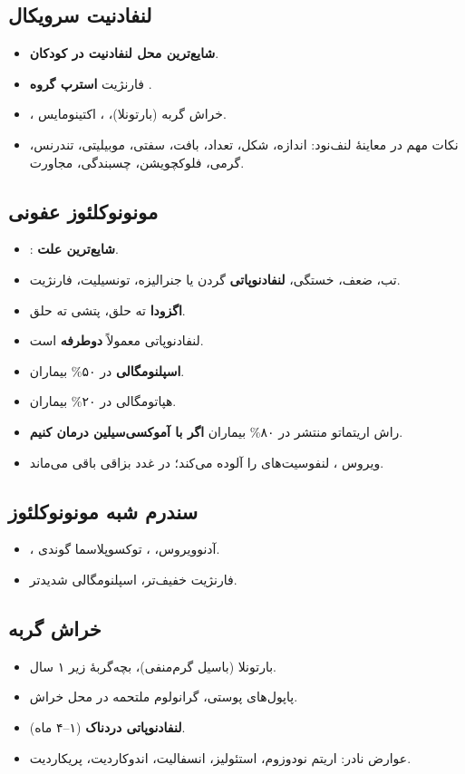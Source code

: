 \documentclass[12pt,a4paper]{article}
\begin{document}
\subsection*{لنفادنیت سرویکال}
\begin{itemize}
\item \textbf{شایع‌ترین محل لنفادنیت در کودکان}.
\item فارنژیت \LymphArrow{} \textbf{استرپ گروه }.
\item {}، خراش گربه (بارتونلا)، ، اکتینومایس.
\item نکات مهم در معاینهٔ لنف‌نود:
  اندازه، شکل، تعداد، بافت، سفتی، موبیلیتی، تندرنس، گرمی،
  فلوکچویشن، چسبندگی، مجاورت.
\end{itemize}

\clearpage
{}

\subsection*{مونونوکلئوز عفونی}
\begin{itemize}
\item {}: \textbf{شایع‌ترین علت}.
\item تب، ضعف، خستگی، \textbf{لنفادنوپاتی} گردن یا جنرالیزه،
  تونسیلیت، فارنژیت.
\item \textbf{اگزودا} ته حلق، پتشی ته حلق.
\item لنفادنوپاتی معمولاً \textbf{دوطرفه} است.
\item \textbf{اسپلنومگالی} در ۵۰\% بیماران.
\item هپاتومگالی در ۲۰\% بیماران.
\item راش اریتماتو منتشر در ۸۰\% بیماران
  \LymphArrow{} \textbf{اگر با آموکسی‌سیلین درمان کنیم}.
\item ویروس ، لنفوسیت‌های  را آلوده می‌کند؛
  در غدد بزاقی باقی می‌ماند.
\end{itemize}

\subsection*{سندرم شبه مونونوکلئوز}
\begin{itemize}
\item {}، آدنوویروس، ، توکسوپلاسما گوندی.
\item {} \LymphArrow{} فارنژیت خفیف‌تر، اسپلنومگالی شدیدتر.
\end{itemize}

\subsection*{خراش گربه}
\begin{itemize}
\item بارتونلا (باسیل گرم‌منفی)، بچه‌گربهٔ زیر ۱ سال.
\item پاپول‌های پوستی، گرانولوم ملتحمه \LymphArrow{} در محل خراش.
\item \textbf{لنفادنوپاتی دردناک} (۱–۴ ماه).
\item عوارض نادر: اریتم نودوزوم، استئولیز، انسفالیت، اندوکاردیت، پریکاردیت.
\end{itemize}
\end{document}

